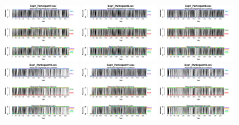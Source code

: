 \begin{figure}[th]
\includegraphics[width=0.30\textwidth]{Figures/BiasResp_Exp1_P7} \includegraphics[width=0.30\textwidth]{Figures/BiasResp_Exp1_P8} \includegraphics[width=0.30\textwidth]{Figures/BiasResp_Exp1_P9}
\includegraphics[width=0.30\textwidth]{Figures/BiasResp_Exp1_P10} \includegraphics[width=0.30\textwidth]{Figures/BiasResp_Exp1_P11} \includegraphics[width=0.30\textwidth]{Figures/BiasResp_Exp1_P12}

\end{figure}
